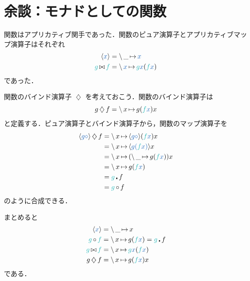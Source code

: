\documentclass[a5paper,twoside,fleqn,draft]{jsbook}
\def\varColor{NavyBlue}
\def\funcColor{BlueGreen}
\newcommand{\mVar}[1]{\textcolor{\varColor}{#1}}
\newcommand{\mAnonParam}{\diamond}
\newcommand{\mXVar}{\mVar{x}}
\newcommand{\mYVar}{\mVar{y}}
\newcommand{\mFunc}[1]{\textcolor{\funcColor}{#1}}
\newcommand{\mFFunc}{{\mFunc{f}}}
\newcommand{\mGFunc}{\mFunc{g}}
\DeclareMathOperator{\mAppMapFunc}{\bowtie}
\DeclareMathOperator{\mBindFunc}{\diamondsuit}
\DeclareMathOperator{\mCompFunc}{\centerdot}
\DeclareMathOperator{\mLambda}{\backslash}
\DeclareMathOperator{\mLambdaArrow}{\mapsto}
\DeclareMathOperator{\mMapFunc}{\circ}
\newcommand{\mConstWith}[1]{\langle\mVar{#1}\rangle}
\newcommand{\mLambdaEXP}[2]{\mLambda{#1}\mLambdaArrow{#2}} %
\begin{document}
\section{余談：モナドとしての関数}

関数はアプリカティブ関手であった．関数のピュア演算子とアプリカティブマップ演算子はそれぞれ
\begin{align}
\mConstWith{x}&=\mLambdaEXP{\_}{\mXVar}\\
\mGFunc\mAppMapFunc\mFFunc&=\mLambdaEXP{\mXVar}{\mGFunc\mXVar(\mFFunc\mXVar)}
\end{align}
であった．

関数のバインド演算子 $\mBindFunc$ を考えておこう．関数のバインド演算子は
\begin{equation}
g\mBindFunc f=\mLambdaEXP{x}{g(\mFFunc\mXVar)x}
\end{equation}
と定義する．ピュア演算子とバインド演算子から，関数のマップ演算子を
\begin{align}
\mConstWith{g\mAnonParam}\mBindFunc f
&=\mLambdaEXP{x}{\mConstWith{g\mAnonParam}(\mFFunc\mXVar)x}\\
&=\mLambdaEXP{x}{\mConstWith{g(\mFFunc\mXVar)}x}\\
&=\mLambdaEXP{x}{(\mLambdaEXP{\_}{g(\mFFunc\mXVar)})x}\\
&=\mLambdaEXP{x}{g(\mFFunc\mXVar)}\\
&=\mGFunc\mCompFunc f\\
&=\mGFunc\mMapFunc f
\end{align}
のように合成できる．

まとめると
\begin{align}
\mConstWith{x}&=\mLambdaEXP{\_}{x}\\
\mGFunc\mMapFunc\mFFunc&=\mLambdaEXP{x}{g(\mFFunc\mXVar)}=\mGFunc\mCompFunc f\\
\mGFunc\mAppMapFunc\mFFunc&=\mLambdaEXP{x}{\mGFunc\mXVar(\mFFunc\mXVar)}\\
g\mBindFunc f&=\mLambdaEXP{x}{g(\mFFunc\mXVar)x}
\end{align}
である．

\end{document}
